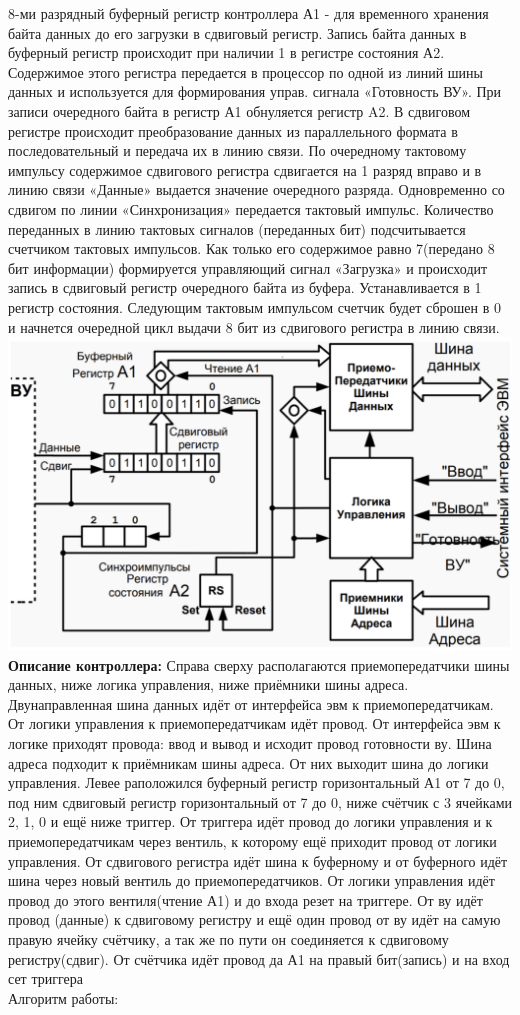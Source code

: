 \documentclass{article}
\begin{document}
8-ми разрядный буферный регистр контроллера А1 - для временного хранения байта данных до его загрузки в сдвиговый регистр. Запись байта данных в буферный регистр происходит при наличии 1 в регистре состояния А2. Содержимое этого регистра передается в процессор по одной из линий шины данных и используется для формирования управ. сигнала «Готовность ВУ». При записи очередного байта в регистр А1 обнуляется регистр A2.
В сдвиговом регистре происходит преобразование данных из параллельного формата в последовательный и передача их в линию связи. По очередному тактовому импульсу содержимое сдвигового регистра сдвигается на 1 разряд вправо и в линию связи «Данные» выдается значение очередного разряда. Одновременно со сдвигом по линии
«Синхронизация» передается тактовый импульс.
Количество переданных в линию тактовых сигналов (переданных бит) подсчитывается счетчиком тактовых импульсов. Как только его содержимое равно 7(передано 8 бит информации) формируется управляющий сигнал «Загрузка» и происходит запись в сдвиговый регистр очередного байта из буфера. Устанавливается в 1 регистр состояния.
Следующим тактовым импульсом счетчик будет сброшен в 0 и начнется очередной цикл выдачи 8 бит из сдвигового регистра в линию связи.
\\
\includegraphics[width=.8\textwidth]{in2.png}\\
\textbf{Описание контроллера:}
Справа сверху располагаются приемопередатчики шины данных, ниже логика управления, ниже приёмники шины адреса. Двунаправленная шина данных идёт от интерфейса эвм к приемопередатчикам. От логики управления к приемопередатчикам идёт провод. От интерфейса эвм к логике приходят провода: ввод и вывод и исходит провод готовности ву. 
Шина адреса подходит к приёмникам шины адреса. От них выходит шина до логики управления. 
Левее раположился буферный регистр горизонтальный А1 от 7 до 0, под ним сдвиговый регистр горизонтальный от 7 до 0, ниже счётчик с 3 ячейками 2, 1, 0 и ещё ниже триггер.
От триггера идёт провод до логики управления и к приемопередатчикам через вентиль, к которому ещё приходит провод от логики управления.
От сдвигового регистра идёт шина к буферному и от буферного идёт шина через новый вентиль до приемопередатчиков.
От логики управления идёт провод до этого вентиля(чтение А1) и до входа резет на триггере.
От ву идёт провод (данные) к сдвиговому регистру и ещё один провод от ву идёт на самую правую ячейку счётчику, а так же по пути он соединяется к сдвиговому регистру(сдвиг).
От счётчика идёт провод да А1 на правый бит(запись) и на вход сет триггера 
\\
Алгоритм работы:
\end{document}
